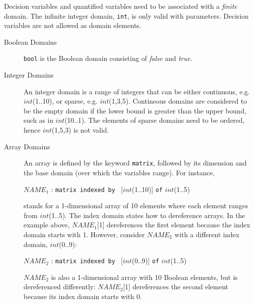 \documentclass{article}
\begin{document}
 Decision variables and quantified
variables need to be associated with a {\em finite} domain. 
The infinite integer domain, {\tt int}, is only valid with parameters. 
Decision variables are not allowed as domain elements.

\begin{description}

\item[Boolean Domains]
 {\tt bool} is the
 Boolean domain consisting of {\em false} and 
{\em true}. 

\item[Integer Domains]
An integer domain is a 
range of integers that can be either continuous,  e.g. $int$(1..10), or
sparse, e.g. $int$(1,3,5). Contineous domains are considered to be the empty 
domain if the lower bound is greater than the upper bound, such as in 
$int$(10..1).
The elements of sparse domains need to be ordered, hence $int$(1,5,3) 
is not valid. %


\item[Array Domains] 
  An array is defined by 
  the keyword {\tt matrix}, followed by its
  dimension and the base domain (over which the variables range).
  For instance,
  \begin{center}
   $NAME_1$ : {\tt matrix indexed by } [$int$(1..10)] {\tt of} $int$(1..5) 
  \end{center}
 stands for a 1-dimensional array of 10 elements where each element
 ranges from  $int$(1..5). The index domain states how to dereference 
 arrays. In the example above, $NAME_1$[1] dereferences the first
 element because the index domain starts with 1. 
 However, consider $NAME_2$ with a different index 
 domain, $int$(0..9):
  \begin{center}
   $NAME_2$ : {\tt matrix indexed by } [$int$(0..9)] {\tt of} $int$(1..5) 
  \end{center}
   $NAME_2$ is also a 1-dimensional array with 10 Boolean elements,
  but is dereferenced differently: $NAME_2$[1] dereferences the second 
  element because its index domain starts with 0.
  






\end{description}
\end{document}
